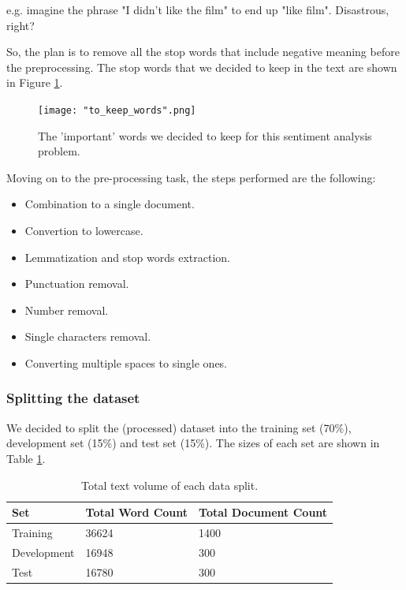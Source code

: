\documentclass[10pt, a4paper]{article}
\begin{document}
	e.g. imagine the phrase "I didn't like the film" to end up "like film". Disastrous, right?
	
	So, the plan is to remove all the stop words that include negative meaning before the preprocessing.
	The stop words that we decided to keep in the text are shown in Figure \ref{fig::to_keep}.
	
	\begin{figure}
		\centering
		\texttt{[image: "to\_keep\_words".png]}
		\caption{The 'important' words we decided to keep for this sentiment analysis problem.}
		\label{fig::to_keep}
	\end{figure}
	
	Moving on to the pre-processing task, the steps performed are the following:
	\begin{itemize}
		\item{ Combination to a single document.}
		\item{ Convertion to lowercase.}
		\item{Lemmatization and stop words extraction.}
		\item{ Punctuation removal.}
		\item{ Number removal.}
		\item{Single characters removal.}
		\item{ Converting multiple spaces to single ones.}
	\end{itemize}
	
	\subsubsection{Splitting the dataset}
	We decided to split the (processed) dataset into the training set (70\%), development set (15\%) and test set (15\%). The sizes of each set are shown in Table \ref{tab::ex-9-stats}.
	
	\begin{table}
		\begin{tabular}{|l|l|l|}
			\hline
			\cellcolor{blue!25}\textbf{Set} & \cellcolor{blue!25}\textbf{Total Word Count} &
			\cellcolor{blue!25}\textbf{Total Document Count}\\
			\hline
			Training & 36624 & 1400 \\\hline
			Development & 16948  & 300 \\\hline
			Test & 16780 & 300 \\\hline
		\end{tabular}
		\centering
		\caption{Total text volume of each data split.}
		\label{tab::ex-9-stats}
	\end{table}
	
\end{document}
